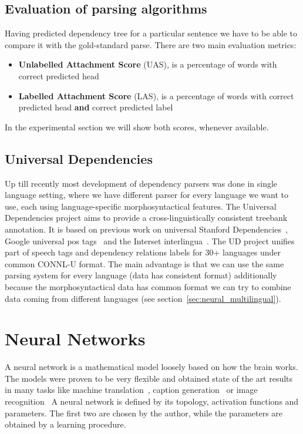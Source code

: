\subsection{Evaluation of parsing algorithms}
Having predicted dependency tree for a particular sentence we have to be able
to compare it with the gold-standard parse.
There are two main evaluation metrics:
\begin{itemize}
    \item \textbf{Unlabelled Attachment Score} (UAS), is a percentage of words
        with correct predicted head
    \item \textbf{Labelled Attachment Score} (LAS), is a percentage of words
        with correct predicted head \textbf{and} correct predicted label
\end{itemize}
In the experimental section we will show both scores, whenever available.

\subsection{Universal Dependencies}
Up till recently most development of dependency parsers was done in single language
setting, where we have different parser for every language we want to use, each
using language-specific morphosyntactical features. The Universal Dependencies
project \cite{nivre_universal_2015} aims to provide a cross-linguistically consistent
treebank annotation. It is based on previous work on universal Stanford
Dependencies~\cite{marneffe_generating_2006},
Google universal pos tags~\cite{petrov_universal_2011}
and the Interset interlingua~\cite{zeman_reusable_2008}.
The UD project unifies part of speech tags and dependency relations labels
for 30+ languages under common CONNL-U format.
The main advantage is that we can use the same parsing system for every language
(data has consistent format) additionally because the morphosyntactical data has
common format we can try to combine data coming from different languages (see
section~\ref{sec:neural_multilingual}).

\section{Neural Networks}
A neural network is a mathematical model loosely based on how the brain works.
The models were proven to be very flexible and obtained state of the art results in
many tasks like machine translation~\cite{bahdanau_neural_2014},
caption generation~\cite{xu_show_2015} or image recognition~\cite{szegedy_goglenet_2014}
A neural network is defined by its topology,
activation functions and parameters. The first two are chosen by the author,
while the parameters are obtained by a learning procedure.

